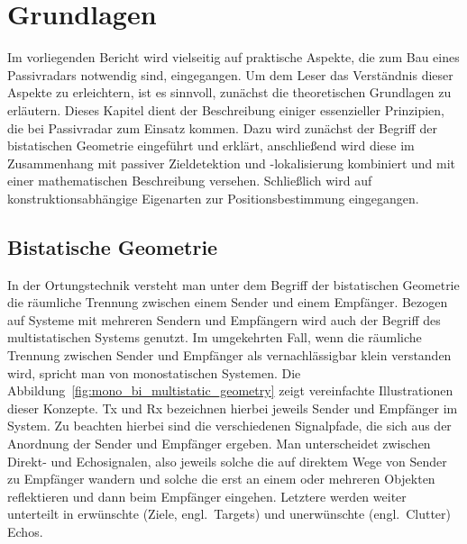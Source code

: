\chapter{Grundlagen}

Im vorliegenden Bericht wird vielseitig auf praktische Aspekte, die zum Bau eines Passivradars notwendig sind, eingegangen. Um dem Leser das Verständnis dieser Aspekte zu erleichtern, ist es sinnvoll, zunächst die theoretischen Grundlagen zu erläutern. Dieses Kapitel dient der Beschreibung einiger essenzieller Prinzipien, die bei Passivradar zum Einsatz kommen. Dazu wird zunächst der Begriff der bistatischen Geometrie eingeführt und erklärt, anschließend wird diese im Zusammenhang mit passiver Zieldetektion und -lokalisierung kombiniert und mit einer mathematischen Beschreibung versehen. Schließlich wird auf konstruktionsabhängige Eigenarten zur Positionsbestimmung eingegangen.

\section{Bistatische Geometrie}\label{sct:bistatic_geometry}

In der Ortungstechnik versteht man unter dem Begriff der bistatischen Geometrie die räumliche Trennung zwischen einem Sender und einem Empfänger. Bezogen auf Systeme mit mehreren Sendern und Empfängern wird auch der Begriff des multistatischen Systems genutzt. Im umgekehrten Fall, wenn die räumliche Trennung zwischen Sender und Empfänger als vernachlässigbar klein verstanden wird, spricht man von monostatischen Systemen. Die Abbildung~\ref{fig:mono_bi_multistatic_geometry} zeigt vereinfachte Illustrationen dieser Konzepte. Tx und Rx bezeichnen hierbei jeweils Sender und Empfänger im System. Zu beachten hierbei sind die verschiedenen Signalpfade, die sich aus der Anordnung der Sender und Empfänger ergeben. Man unterscheidet zwischen Direkt- und Echosignalen, also jeweils solche die auf direktem Wege von Sender zu Empfänger wandern und solche die erst an einem oder mehreren Objekten reflektieren und dann beim Empfänger eingehen. Letztere werden weiter unterteilt in erwünschte (Ziele, engl.\ Targets) und unerwünschte (engl.\ Clutter) Echos.

